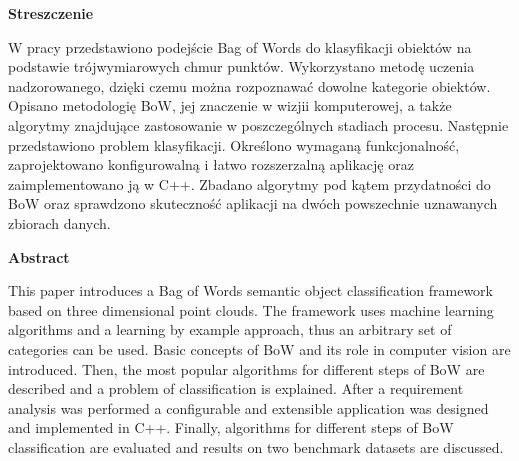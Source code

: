 \begin{center}
\begin{LARGE}\textbf{Streszczenie}\end{LARGE}
\end{center}

\vspace{1.0cm}

	W pracy przedstawiono podejście Bag of Words do klasyfikacji obiektów na podstawie trójwymiarowych chmur punktów. Wykorzystano metodę uczenia nadzorowanego, dzięki czemu można rozpoznawać dowolne kategorie obiektów. Opisano metodologię BoW, jej znaczenie w wizjii komputerowej, a także algorytmy znajdujące zastosowanie w poszczególnych stadiach procesu. Następnie przedstawiono problem klasyfikacji. Określono wymaganą funkcjonalność, zaprojektowano konfigurowalną i łatwo rozszerzalną aplikację oraz zaimplementowano ją w C++. Zbadano algorytmy pod kątem przydatności do BoW oraz sprawdzono skuteczność aplikacji na dwóch powszechnie uznawanych zbiorach danych.

\vspace{3.0cm}

\begin{center}
\begin{LARGE}\textbf{Abstract}\end{LARGE}
\end{center}

\vspace{1.0cm}

	This paper introduces a Bag of Words semantic object classification framework based on three dimensional point clouds. The framework uses machine learning algorithms and a learning by example approach, thus an arbitrary set of categories can be used. Basic concepts of BoW and its role in computer vision are introduced. Then, the most popular algorithms for different steps of BoW are described and a problem of classification is explained. After a requirement analysis was performed a configurable and extensible application was designed and implemented in C++. Finally, algorithms for different steps of BoW classification are evaluated and results on two benchmark datasets are discussed.
	

	
	


